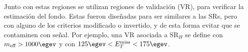 Junto con estas regiones se utilizan regiones de validación (VR), para verificar la estimación del fondo. Estas fueron diseñadas para ser similares a las SRs, pero con alguno de los criterios modificado o invertido, y de esta forma evitar que se contaminen con señal. Por ejemplo, una VR asociada a SR$_{H}$ se define con $m_{\text{eff}}>1000 \egev$ y con $125 \egev < E_{T}^{\text{miss}} < 175 \egev$. 